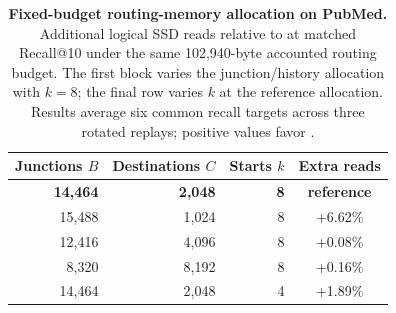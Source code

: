 \begin{table}[t]
\centering
\caption{\textbf{Fixed-budget routing-memory allocation on PubMed.} Additional logical SSD reads relative to \sys at matched Recall@10 under the same 102,940-byte accounted routing budget. The first block varies the junction/history allocation with $k=8$; the final row varies $k$ at the reference allocation. Results average six common recall targets across three rotated replays; positive values favor \sys.}
\label{tab:eval-core-reallocation}
\small
\setlength{\tabcolsep}{4pt}
\begin{tabular}{@{}rrrc@{}}
\toprule
Junctions $B$ & Destinations $C$ & Starts $k$ & Extra reads \\
\midrule
\textbf{14,464} & \textbf{2,048} & \textbf{8} & \textbf{reference} \\
15,488 & 1,024 & 8 & +6.62\% \\
12,416 & 4,096 & 8 & +0.08\% \\
8,320 & 8,192 & 8 & +0.16\% \\
\midrule
14,464 & 2,048 & 4 & +1.89\% \\
\bottomrule
\end{tabular}
\end{table}
